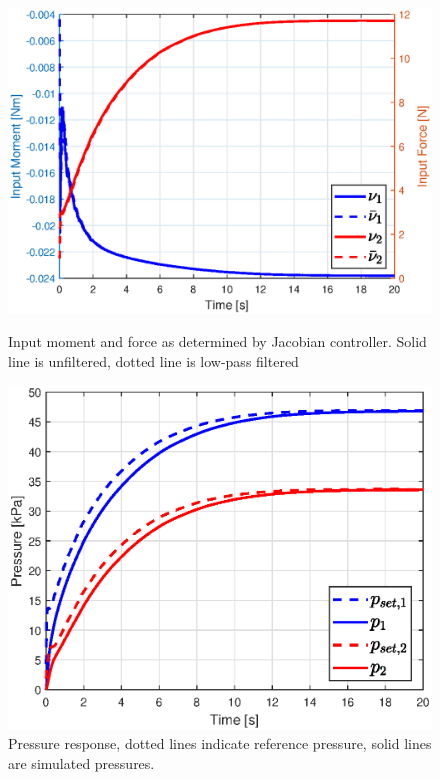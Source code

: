 \begin{figure}[H]
\centering
\begin{minipage}{0.5\textwidth}
        \centering
        \includegraphics[width=\textwidth]{Figures/Chapter5/jacinputstepsim.eps} 
        \caption{Input moment and force as determined by Jacobian controller. Solid line is unfiltered, dotted line is low-pass filtered}
        \label{fig5:inputsim}

    \end{minipage}\hfill
    \begin{minipage}{0.5\textwidth}
        \centering
        \includegraphics[width=\textwidth]{Figures/Chapter5/pressuresimstep.eps}
        \caption{Pressure response, dotted lines indicate reference pressure, solid lines are simulated pressures.}
        \label{fig5:pressuresim}
    \end{minipage}
\end{figure}




